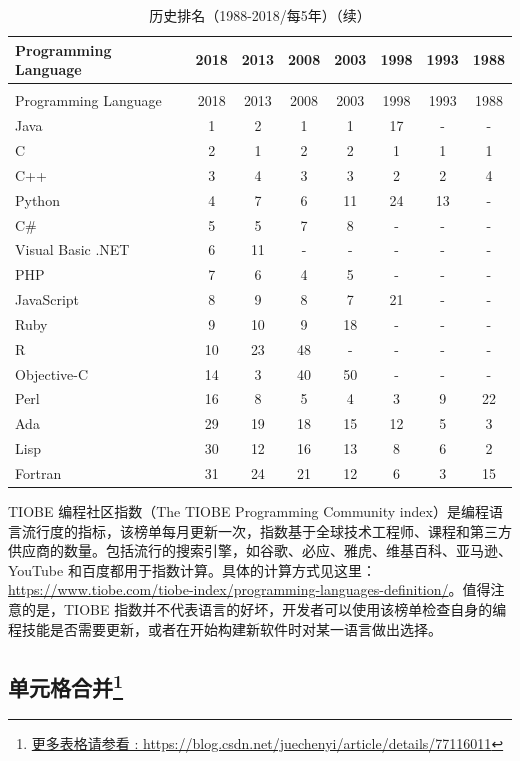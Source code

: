\begin{longtabu}{lccccccc} %
	\caption{历史排名（1988-2018/每5年）}\label{tab:tabu_test_4}\\
	\toprule
	Programming Language	&	2018	&	2013	&	2008	&	2003	&	1998	&	1993	&	1988	\\	
	\midrule%
	\endfirsthead
	\caption{历史排名（1988-2018/每5年）（续）}\\
	\toprule
	Programming Language	&	2018	&	2013	&	2008	&	2003	&	1998	&	1993	&	1988	\\
	\midrule%
	\endhead
	\bottomrule%
	\endfoot
	Java	&	1	&	2	&	1	&	1	&	17	&	-	&	-	\\
	C	&	2	&	1	&	2	&	2	&	1	&	1	&	1	\\
	C++	&	3	&	4	&	3	&	3	&	2	&	2	&	4	\\
	Python	&	4	&	7	&	6	&	11	&	24	&	13	&	-	\\
	C$\#$	&	5	&	5	&	7	&	8	&	-	&	-	&	-	\\
	Visual Basic .NET	&	6	&	11	&	-	&	-	&	-	&	-	&	-	\\
	PHP	&	7	&	6	&	4	&	5	&	-	&	-	&	-	\\
	JavaScript	&	8	&	9	&	8	&	7	&	21	&	-	&	-	\\
	Ruby	&	9	&	10	&	9	&	18	&	-	&	-	&	-	\\
	R	&	10	&	23	&	48	&	-	&	-	&	-	&	-	\\
	Objective-C	&	14	&	3	&	40	&	50	&	-	&	-	&	-	\\
	Perl	&	16	&	8	&	5	&	4	&	3	&	9	&	22	\\
	Ada	&	29	&	19	&	18	&	15	&	12	&	5	&	3	\\
	Lisp	&	30	&	12	&	16	&	13	&	8	&	6	&	2	\\
	Fortran	&	31	&	24	&	21	&	12	&	6	&	3	&	15	\\
\end{longtabu}
TIOBE 编程社区指数（The TIOBE Programming Community index）是编程语言流行度的指标，该榜单每月更新一次，指数基于全球技术工程师、课程和第三方供应商的数量。包括流行的搜索引擎，如谷歌、必应、雅虎、维基百科、亚马逊、YouTube 和百度都用于指数计算。具体的计算方式见这里：\href{https://www.tiobe.com/tiobe-index/programming-languages-definition/}{https://www.tiobe.com/tiobe-index/programming-languages-definition/}。值得注意的是，TIOBE 指数并不代表语言的好坏，开发者可以使用该榜单检查自身的编程技能是否需要更新，或者在开始构建新软件时对某一语言做出选择。

\subsection{单元格合并\footnote{\href{https://blog.csdn.net/juechenyi/article/details/77116011}{更多表格请参看 : https://blog.csdn.net/juechenyi/article/details/77116011}}}\label{sec:unit}

